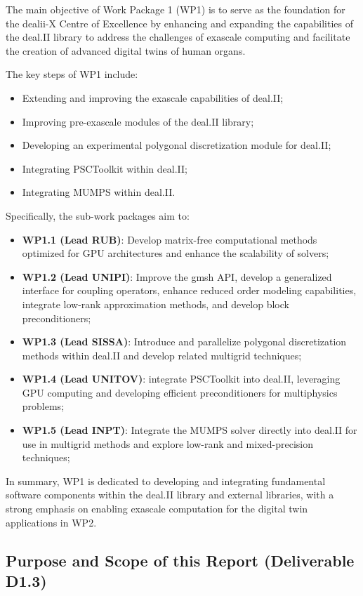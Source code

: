 \documentclass[a4paper,12pt]{article}
\begin{document}
The main objective of Work Package 1 (WP1) is to serve as the foundation
for the dealii-X Centre of Excellence by enhancing and expanding the
capabilities of the deal.II library to address the challenges of exascale
computing and facilitate the creation of advanced digital twins of human
organs.

The key steps of WP1 include:
\begin{itemize}
    \item Extending and improving the exascale capabilities of deal.II;
    \item Improving pre-exascale modules of the deal.II library;
    \item Developing an experimental polygonal discretization module for deal.II;
    \item Integrating PSCToolkit within deal.II;
    \item Integrating MUMPS within deal.II.
\end{itemize}

Specifically, the sub-work packages aim to:
\begin{itemize}
    \item \textbf{WP1.1 (Lead RUB)}: Develop matrix-free computational methods optimized for GPU architectures and enhance the scalability of solvers;
    \item \textbf{WP1.2 (Lead UNIPI)}: Improve the gmsh API, develop a generalized interface for coupling operators, enhance reduced order modeling capabilities, integrate low-rank approximation methods, and develop block preconditioners;
    \item \textbf{WP1.3 (Lead SISSA)}: Introduce and parallelize polygonal discretization methods within deal.II and develop related multigrid techniques;
    \item \textbf{WP1.4 (Lead UNITOV)}: integrate PSCToolkit into deal.II, leveraging GPU computing and developing efficient preconditioners for multiphysics problems;
    \item \textbf{WP1.5 (Lead INPT)}: Integrate the MUMPS solver directly into deal.II for use in multigrid methods and explore low-rank and mixed-precision techniques;
\end{itemize}

In summary, WP1 is dedicated to developing and integrating fundamental software components within the deal.II library and external libraries, with a strong emphasis on enabling exascale computation for the digital twin applications in WP2.

\subsection{Purpose and Scope of this Report (Deliverable D1.3)}
\end{document}
